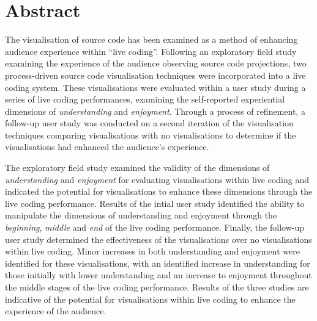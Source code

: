 
\chapter*{Abstract}
\label{chap:abstract}

The visualisation of source code has been examined as a method of enhancing audience experience within ``live coding''. Following an exploratory field study examining the experience of the audience observing source code projections, two process-driven source code visualisation techniques were incorporated into a live coding system. These visualisations were evaluated within a user study during a series of live coding performances, examining the self-reported experiential dimensions of \emph{understanding} and \emph{enjoyment}. Through a process of refinement, a follow-up user study was conducted on a second iteration of the visualisation techniques comparing visualisations with no visualisations to determine if the visualisations had enhanced the audience's experience.

The exploratory field study examined the validity of the dimensions of \emph{understanding} and \emph{enjoyment} for evaluating visualisations within live coding and indicated the potential for visualisations to enhance these dimensions through the live coding performance. Results of the intial user study identified the ability to manipulate the dimensions of understanding and enjoyment through the \emph{beginning}, \emph{middle} and \emph{end} of the live coding performance. Finally, the follow-up user study determined the effectiveness of the visualisations over no visualisations within live coding. Minor increases in both understanding and enjoyment were identified for these visualisations, with an identified increase in understanding for those initially with lower understanding and an increase to enjoyment throughout the middle stages of the live coding performance. Results of the three studies are indicative of the potential for visualisations within live coding to enhance the experience of the audience. 

